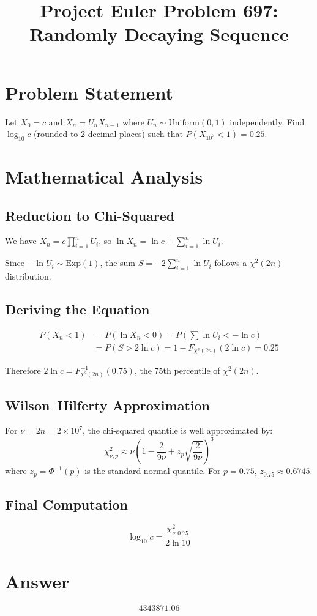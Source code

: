 \documentclass[12pt]{article}
\title{Project Euler Problem 697: Randomly Decaying Sequence}
\author{}
\date{}
\begin{document}
\maketitle

\section{Problem Statement}
Let $X_0 = c$ and $X_n = U_n X_{n-1}$ where $U_n \sim \text{Uniform}(0,1)$ independently. Find $\log_{10} c$ (rounded to 2 decimal places) such that $P(X_{10^7} < 1) = 0.25$.

\section{Mathematical Analysis}

\subsection{Reduction to Chi-Squared}
We have $X_n = c \prod_{i=1}^n U_i$, so $\ln X_n = \ln c + \sum_{i=1}^n \ln U_i$.

Since $-\ln U_i \sim \text{Exp}(1)$, the sum $S = -2\sum_{i=1}^n \ln U_i$ follows a $\chi^2(2n)$ distribution.

\subsection{Deriving the Equation}
\begin{align}
P(X_n < 1) &= P(\ln X_n < 0) = P\left(\sum \ln U_i < -\ln c\right) \\
&= P(S > 2\ln c) = 1 - F_{\chi^2(2n)}(2\ln c) = 0.25
\end{align}

Therefore $2\ln c = F_{\chi^2(2n)}^{-1}(0.75)$, the 75th percentile of $\chi^2(2n)$.

\subsection{Wilson--Hilferty Approximation}
For $\nu = 2n = 2 \times 10^7$, the chi-squared quantile is well approximated by:
\[
\chi^2_{\nu,p} \approx \nu \left(1 - \frac{2}{9\nu} + z_p \sqrt{\frac{2}{9\nu}}\right)^3
\]
where $z_p = \Phi^{-1}(p)$ is the standard normal quantile. For $p = 0.75$, $z_{0.75} \approx 0.6745$.

\subsection{Final Computation}
\[
\log_{10} c = \frac{\chi^2_{\nu,0.75}}{2 \ln 10}
\]

\section{Answer}

\[
\boxed{4343871.06}
\]
\end{document}
